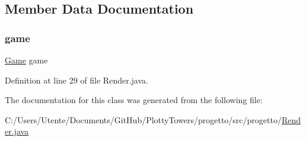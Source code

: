 \subsection{Member Data Documentation}
\mbox{\label{classprogetto_1_1_render_ac6a5ed6191fcf3a5bf0445921feb4f48}} 
\subsubsection{\texorpdfstring{game}{game}}
{\footnotesize\ttfamily \hyperlink{classprogetto_1_1_game}{Game} game\hspace{0.3cm}{\ttfamily [private]}}



Definition at line 29 of file Render.\+java.



The documentation for this class was generated from the following file\+:\begin{DoxyCompactItemize}
\item 
C\+:/\+Users/\+Utente/\+Documents/\+Git\+Hub/\+Plotty\+Towers/progetto/src/progetto/\hyperlink{_render_8java}{Render.\+java}\end{DoxyCompactItemize}

